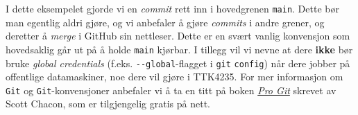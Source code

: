 I dette eksempelet gjorde vi en \textit{commit} rett inn i hovedgrenen \verb|main|. Dette bør man egentlig aldri gjøre, og vi anbefaler å gjøre \textit{commits} i andre grener, og deretter å \textit{merge} i GitHub sin nettleser. Dette er en svært vanlig konvensjon som hovedsaklig går ut på å holde \verb|main| kjørbar. I tillegg vil vi nevne at dere {\bf{ikke}} bør bruke \textit{global credentials} (f.eks. \verb|--global|-flagget i \verb|git| \verb|config|) når dere jobber på offentlige datamaskiner, noe dere vil gjøre i TTK4235. For mer informasjon om \verb|Git| og \verb|Git|-konvensjoner anbefaler vi å ta en titt på boken \href{https://git-scm.com/book/en/v2}{{\it Pro Git}} skrevet av Scott Chacon, som er tilgjengelig gratis på nett.







